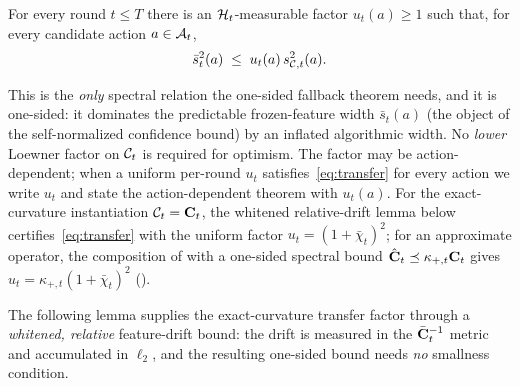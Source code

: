 \begin{assumption}\label{asm:transfer}
For every round $t\le T$ there is an $\mathcal{H}_t$-measurable factor
$u_t(a)\ge 1$ such that, for every candidate action $a\in\mathcal{A}_t$,
\begin{equation}\label{eq:transfer}
  \bar s_t^2(a)\;\le\;u_t(a)\,s_{\mathcal{C},t}^2(a).
\end{equation}
\end{assumption}

This is the \emph{only} spectral relation the one-sided fallback theorem needs, and it is
one-sided: it dominates the predictable frozen-feature width $\bar s_t(a)$
(the object of the self-normalized confidence bound) by an inflated
algorithmic width.  No \emph{lower} Loewner factor on $\mathcal{C}_t$ is required
for optimism.  The factor may be action-dependent; when a uniform per-round
$u_t$ satisfies~\eqref{eq:transfer} for every action we write $u_t$ and
state the action-dependent theorem with $u_t(a)$.
For the exact-curvature instantiation $\mathcal{C}_t=\mathbf{C}_t$, the whitened
relative-drift lemma below certifies~\eqref{eq:transfer} with the uniform
factor $u_t=(1+\bar\chi_t)^2$; for an approximate operator, the composition
of  with a one-sided spectral bound
$\hat{\mathbf{C}}_t\preceq\kappa_{+,t}\mathbf{C}_t$ gives
$u_t=\kappa_{+,t}(1+\bar\chi_t)^2$ ().

The following lemma supplies the exact-curvature transfer factor through a
\emph{whitened, relative} feature-drift bound: the drift is measured in the
$\bar{\mathbf{C}}_t^{-1}$ metric and accumulated in $\ell_2$, and the resulting
one-sided bound needs \emph{no} smallness condition.

